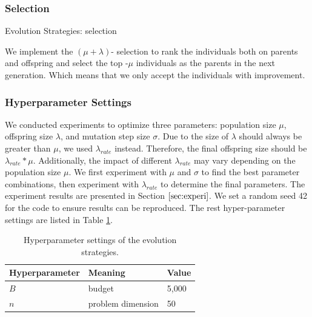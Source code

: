 \documentclass{article}
\begin{document}
\subsubsection{Selection}

\begin{algorithm}[!ht]
\SetAlgoLined
{}
\BlankLine
{}

\caption{Evolution Strategies: selection}\label{al:es-selection}
\end{algorithm}

We implement the $(\mu + \lambda)$- selection to rank the individuals both on parents and offspring and select the top -$\mu$ individuals as the parents in the next generation. Which means that we only accept the individuals with improvement. 

\subsubsection{Hyperparameter Settings}
We conducted experiments to optimize three parameters: population size $\mu$, offspring size $\lambda$, and mutation step size $\sigma$. Due to the size of $\lambda$ should always be greater than $\mu$, we used $\lambda_{rate}$ instead. Therefore, the final offspring size should be $\lambda_{rate} * \mu$. Additionally, the impact of different $\lambda_{rate}$ may vary depending on the population size $\mu$. We first experiment with $\mu$ and $\sigma$ to find the best parameter combinations, then experiment with $\lambda_{rate}$ to determine the final parameters. The experiment results are presented in Section $\ref{sec:experi}$. We set a random seed 42 for the code to ensure results can be reproduced. The rest hyper-parameter settings are listed in Table \ref{tab:al-es-hyper}.

\begin{table}[!ht]
    \centering
    \caption{Hyperparameter settings of the evolution strategies.}
    \label{tab:al-es-hyper}
    \begin{tabular}{lll}
       \toprule
       \textbf{Hyperparameter} & \textbf{Meaning} & \textbf{Value}\\
       \midrule
       $B$ & budget & 5,000\\
       $n$ & problem dimension & 50\\
       \bottomrule
    \end{tabular}
\end{table}
\end{document}
